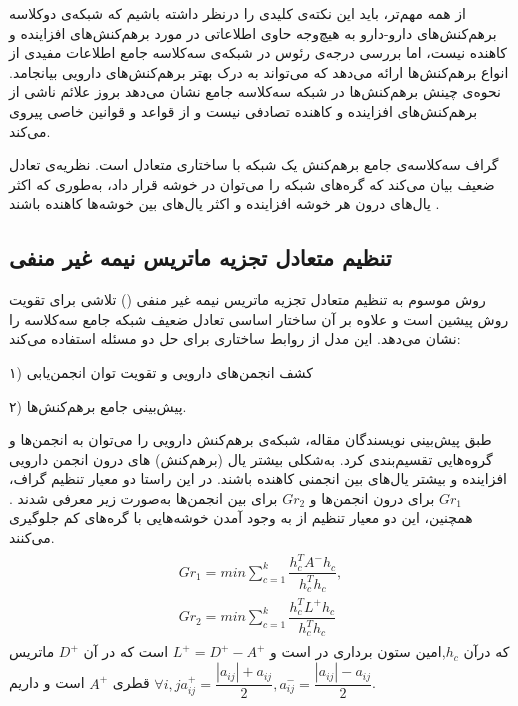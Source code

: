 از همه مهم‌تر، باید این نکته‌ی کلیدی را درنظر داشته باشیم که شبکه‌ی دوکلاسه برهم‌کنش‌های دارو-دارو به هیچ‌وجه حاوی اطلاعاتی در مورد برهم‌کنش‌های افزاینده و کاهنده نیست، اما بررسی درجه‌ی رئوس در شبکه‌ی سه‌کلاسه جامع اطلاعات مفیدی از انواع برهم‌کنش‌ها ارائه می‌دهد که می‌تواند به درک بهتر برهم‌کنش‌های دارویی بیانجامد. نحوه‌ی چینش برهم‌کنش‌ها در شبکه سه‌کلاسه جامع نشان می‌دهد بروز علائم ناشی از برهم‌کنش‌های افزاینده و کاهنده تصادفی نیست و از قواعد و قوانین خاصی پیروی می‌کند.


گراف سه‌کلاسه‌ی جامع برهم‌کنش یک شبکه با ساختاری متعادل
است. نظریه‌ی تعادل ضعیف
بیان می‌کند که گره‌های شبکه‌ را می‌توان در
خوشه قرار داد، به‌طوری که اکثر یال‌های درون هر خوشه افزاینده و اکثر یال‌های بین خوشه‌ها کاهنده باشند
\cite{Davis1967}.


\subsection{تنظیم متعادل تجزیه ماتریس نیمه غیر منفی}

روش موسوم به تنظیم متعادل تجزیه ماتریس نیمه غیر منفی
\cite{Shi J2019} 
 ()
تلاشی برای تقویت روش
پیشین است و علاوه بر آن ساختار اساسی تعادل ضعیف شبکه جامع سه‌کلاسه را نشان می‌دهد. این مدل از روابط ساختاری برای حل دو مسئله استفاده می‌کند: 
 
۱) کشف انجمن‌های دارویی و تقویت توان انجمن‌یابی

۲) پیش‌بینی جامع برهم‌کنش‌ها. 

طبق پیش‌بینی نویسندگان مقاله، شبکه‌ی برهم‌کنش دارویی را می‌توان به انجمن‌ها و گروه‌هایی تقسیم‌بندی کرد. به‌شکلی بیشتر یال (برهم‌کنش) های درون انجمن دارویی افزاینده و بیشتر یال‌های بین انجمنی کاهنده باشند. در این راستا دو معیار تنظیم گراف،
$Gr_1$
برای درون انجمن‌ها و
$Gr_2$
برای بین انجمن‌ها به‌صورت زیر معرفی شدند . همچنین، این دو معیار تنظیم از به وجود آمدن خوشه‌هایی با گره‌های کم جلوگیری می‌کنند.
\begin{equation}
\begin{aligned}
\begin{split}
Gr_1 = min \sum^k_{c=1}\dfrac{{h^T_c}{A^-}{h_c}}{{h^T_c}{h_c}},
\\
Gr_2 = min \sum^k_{c=1}\dfrac{{h^T_c}{L^+}{h_c}}{{h^T_c}{h_c}}
\end{split}
\end{aligned}
\end{equation}
که درآن
$h_c$,امین
ستون برداری در 
است و 
$L^+=D^+-A^+$
است که در آن
$D^+$
ماتریس قطری
$A^+$
است و داریم
$\forall i,j a^+_{ij}=\dfrac{|a_{ij}|+a_{ij}}{2} , a^-_{ij}=\dfrac{|a_{ij}|-a_{ij}}{2}$.

